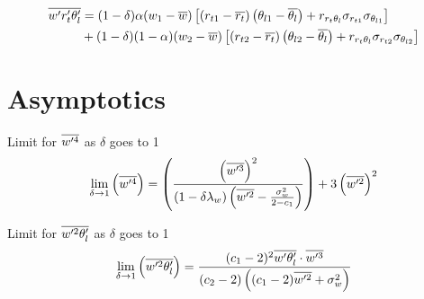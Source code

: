 \documentclass[10pt]{beamer}
\numberwithin{equation}{section}
\begin{document}
    \begin{frame}
        \begin{align}
            \label{eq:w_prime_r_t_prime_t_l_prime_bar}
            \overline{w' r_t' \theta_l'}
            &= (1 - \delta) \alpha (w_1 - \overline{w}) \left[
                \left(r_{t1} - \overline{r_t}\right)
                \left(\theta_{l1} - \overline{\theta_l}\right) +
                r_{r_t \theta_l} \sigma_{r_{t1}} \sigma_{\theta_{l1}}
                \right] \nonumber\\
            &+ (1 - \delta) (1 - \alpha) (w_2 - \overline{w}) \left[
                \left(r_{t2} - \overline{r_t}\right)
                \left(\theta_{l2} - \overline{\theta_l}\right) +
                r_{r_t \theta_l} \sigma_{r_{t2}} \sigma_{\theta_{l2}}
                \right]
        \end{align}
    \end{frame}


    \section{Asymptotics}\label{sec:asymptotics}

    \begin{frame}{Limit for \texorpdfstring{$\overline{w'^4}$}{wprime4bar} as \texorpdfstring{$\delta$}{delta} goes to 1}
        \begin{align}
            \label{eq:limit_wprime4_delta_to_1}
            \lim_{\delta \to 1}\left(\overline{w'^4}\right)
            = \left(
            \frac{
                \left(\overline{w'^3}\right)^2
            }{
                (1 - \delta\lambda_w)
                \left(\overline{w'^2} - \frac{\sigma_w^2}{2 - c_1}\right)
            }
            \right)
            + 3 \left(\overline{w'^2}\right)^2
        \end{align}
    \end{frame}

    \begin{frame}{Limit for \texorpdfstring{$\overline{w'^2 \theta_l'}$}{wprime2thetalbar} as \texorpdfstring{$\delta$}{delta} goes to 1}
        \begin{align}
            \label{eq:limit_wprime2thetalbar_delta_to_1}
            \lim_{\delta \to 1}\left(\overline{w'^2 \theta_l'}\right)
            = \frac{(c_1 - 2)^2 \overline{w' \theta_l'} \cdot \overline{w'^3}}{(c_2 - 2)\left((c_1 - 2)\overline{w'^2} + \sigma_w^2\right)}
        \end{align}
    \end{frame}
\end{document}
